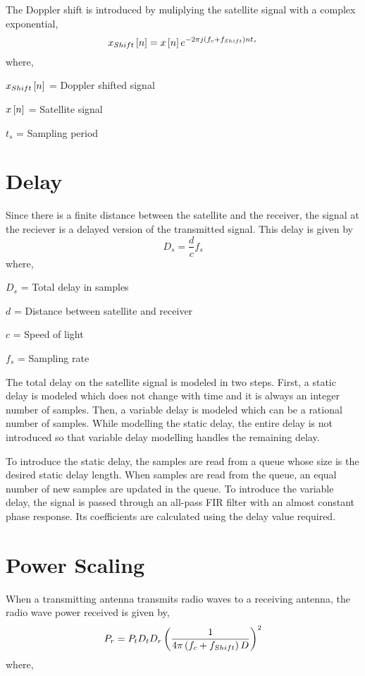 The Doppler shift is introduced by muliplying the satellite signal with a complex exponential,
\begin{equation}
    x_{Shift}{}\left[n\right] = x{}\left[n\right]e^{-2 \pi j \left(f_{c}+f_{Shift}\right) n t_{s}}
\end{equation}
where,

$x_{Shift}{}\left[n\right]$ = Doppler shifted signal

$x{}\left[n\right]$ = Satellite signal

$t_{s}$ = Sampling period

\section{Delay}
Since there is a finite distance between the satellite and the receiver, the signal at the reciever is a delayed version of the transmitted signal. This delay is given by
\begin{equation}
    D_{s} = \frac{d}{c}f_{s} 
\end{equation}
where,

$D_{s}$ = Total delay in samples

$d$ = Distance between satellite and receiver

$c$ = Speed of light

$f_{s}$ = Sampling rate

The total delay on the satellite signal is modeled in two steps. First, a static delay is modeled which does not change with time and it is always an integer number of samples. Then, %
a variable delay is modeled which can be a rational number of samples. While modelling the static delay, the entire delay is not introduced so that variable delay modelling handles the remaining %
delay.

To introduce the static delay, the samples are read from a queue whose size is the desired static delay length. When samples are read from the queue, an equal number of new samples are %
updated in the queue. To introduce the variable delay, the signal is passed through an all-pass FIR filter with an almost constant phase response. Its coefficients are calculated %
using the delay value required.

\section{Power Scaling}
When a transmitting antenna transmits radio waves to a receiving antenna, the radio wave power received is given by,
\begin{equation}
    P_r = P_t D_t D_r \left(\frac{1}{4 \pi \left(f_c + f_{Shift}\right) D}\right)^2
\end{equation}
where,

